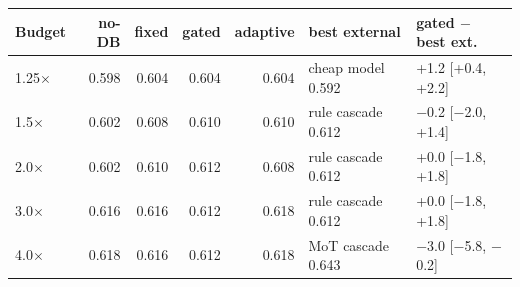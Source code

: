 \begin{tabular}{@{}lrrrrll@{}}
\toprule
Budget & no-DB & fixed & gated & adaptive & best external & gated $-$ best ext. \\
\midrule
1.25$\times$ & 0.598 & 0.604 & 0.604 & 0.604 & cheap model 0.592 & +1.2 [+0.4, +2.2] \\
1.5$\times$ & 0.602 & 0.608 & 0.610 & 0.610 & rule cascade 0.612 & $-$0.2 [$-$2.0, +1.4] \\
2.0$\times$ & 0.602 & 0.610 & 0.612 & 0.608 & rule cascade 0.612 & +0.0 [$-$1.8, +1.8] \\
3.0$\times$ & 0.616 & 0.616 & 0.612 & 0.618 & rule cascade 0.612 & +0.0 [$-$1.8, +1.8] \\
4.0$\times$ & 0.618 & 0.616 & 0.612 & 0.618 & MoT cascade 0.643 & $-$3.0 [$-$5.8, $-$0.2] \\
\bottomrule
\end{tabular}